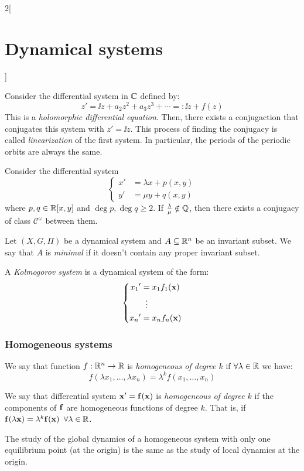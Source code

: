 \documentclass[../../../main_math.tex]{subfiles}
\begin{document}
\begin{multicols}{2}[\section{Dynamical systems}]
\begin{theorem}
  \end{theorem}
  \begin{theorem}
    Consider the differential system in $\mathbb{C}$ defined by:
    $$z'=\ii z+ a_2z^2+a_3z^3+\cdots=:\ii z+f(z)$$ This is a \emph{holomorphic differential equation}. Then, there exists a conjugaction that conjugates this system with $z'=\ii z$. This process of finding the conjugacy is called \emph{linearization} of the first system. In particular, the periods of the periodic orbits are always the same.
  \end{theorem}
  \begin{theorem}
    Consider the differential system
    $$
      \left\{
      \begin{aligned}
        {x}' & = \lambda x+ p(x,y) \\
        {y}' & = \mu y+ q(x,y)
      \end{aligned}
      \right.
    $$
    where $p,q\in\mathbb{R}[x,y]$ and $\deg p,\deg q\geq 2$. If $\frac{\lambda}{\mu}\notin\mathbb{Q}$, then there exists a conjugacy of class $\mathcal{C}^\omega$ between them.
  \end{theorem}
  \begin{definition}
    Let $(X,G,\Pi)$ be a dynamical system and $A\subseteq \mathbb{R}^n$ be an invariant subset. We say that $A$ is \emph{minimal} if it doesn't contain any proper invariant subset.
  \end{definition}
  \begin{definition}
    A \emph{Kolmogorov system} is a dynamical system of the form:
    \begin{equation}
      \left\{
      \begin{aligned}
        {x_1}' & =x_1 f_1(\boldsymbol{\mathrm{x}}) \\
               & \;\;\vdots       \\
        {x_n}' & =x_n f_n(\boldsymbol{\mathrm{x}})
      \end{aligned}
      \right.
    \end{equation}
  \end{definition}
  \subsubsection{Homogeneous systems}
  \begin{definition}
    We say that function $f:\mathbb{R}^n\rightarrow\mathbb{R}$ is \emph{homogeneous of degree $k$} if $\forall\lambda\in\mathbb{R}$ we have:
    $$f(\lambda x_1,\ldots,\lambda x_n)=\lambda^k f(x_1,\ldots,x_n)$$
  \end{definition}
  \begin{definition}
    We say that differential system $\boldsymbol{\mathrm{x}}'=\boldsymbol{\mathrm{f}}(\boldsymbol{\mathrm{x}})$ is \emph{homogeneous of degree $k$} if the components of $\boldsymbol{\mathrm{f}}$ are homogeneous functions of degree $k$. That is, if $\boldsymbol{\mathrm{f}}(\lambda \boldsymbol{\mathrm{x}})=\lambda^k\boldsymbol{\mathrm{f}}(\boldsymbol{\mathrm{x}})$ $\forall \lambda\in \mathbb{R}$.
  \end{definition}
  \begin{proposition}
    The study of the global dynamics of a homogeneous system with only one equilibrium point (at the origin) is the same as the study of local dynamics at the origin.
  \end{proposition}

\end{multicols}
\end{document}
